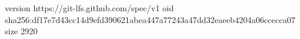 version https://git-lfs.github.com/spec/v1
oid sha256:df17e7d43cc14d9efd390621abea447a77243a47dd32eaeeb4204a06ccecca07
size 2920
